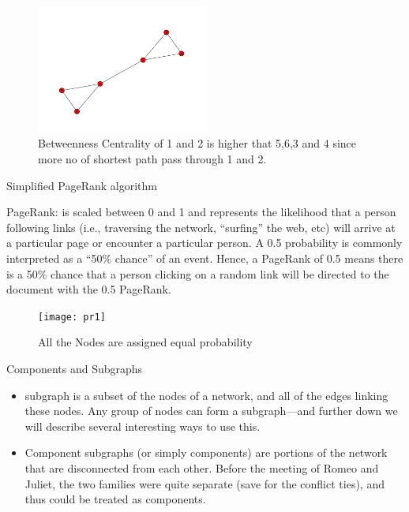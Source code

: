 \documentclass[AER]{AEA}
\begin{document}
\begin{figure}[h]
\caption{Betweenness Centrality of 1 and 2 is higher that 5,6,3 and 4 since more no of shortest path pass through 1 and 2.}
\centering
\includegraphics[width=0.5\textwidth]{betweeness_example}
\end{figure}

Simplified PageRank algorithm 

PageRank: is scaled between 0 and 1 and represents the likelihood that a person following links (i.e., traversing the network, “surfing” the web, etc) will arrive at a particular page or encounter a particular person. A 0.5 probability is commonly interpreted as a “50\% chance” of an event. Hence, a PageRank of 0.5 means there is a 50\% chance that a person clicking on a random link will be directed to the document with the 0.5 PageRank. 

\begin{figure}[h]
\caption{All the Nodes are assigned equal probability}
\centering
\texttt{[image: pr1]}
\end{figure}

Components and Subgraphs 
\begin{itemize}

\item subgraph is a subset of the nodes of a network, and all of the edges linking these nodes. Any group of nodes can form a subgraph—and further down we will describe several interesting ways to use this. 

\item Component subgraphs (or simply components) are portions of the network that are disconnected from each other. Before the meeting of Romeo and Juliet, the two families were quite separate (save for the conflict ties), and thus could be treated as components. 

\end{itemize}
\end{document}
